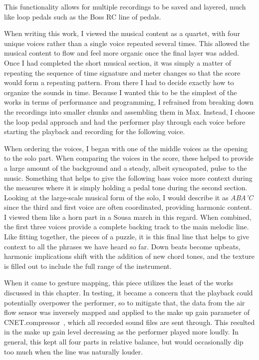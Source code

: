 This functionality allows for multiple recordings to be saved and layered, much like loop pedals such as the Boss RC line of pedals.

When writing this work, I viewed the musical content as a quartet, with four unique voices rather than a single voice repeated several times. This allowed the musical content to flow and feel more organic once the final layer was added. 
Once I had completed the short musical section, it was simply a matter of repeating the sequence of time signature and meter changes so that the score would form a repeating pattern. From there I had to decide exactly how to organize the sounds in time. Because I wanted this to be the simplest of the works in terms of performance and programming, I refrained from breaking down the recordings into smaller chunks and assembling them in Max. Instead, I choose the loop pedal approach and had the performer play through each voice before starting the playback and recording for the following voice. 

When ordering the voices, I began with one of the middle voices as the opening to the solo part. When comparing the voices in the score, these helped to provide a large amount of the background and a steady, albeit syncopated, pulse to the music. Something that helps to give the following bass voice more context during the measures where it is simply holding a pedal tone during the second section. Looking at the large-scale musical form of the solo, I would describe it as \emph{ABA'C} since the third and first voice are often coordinated, providing harmonic content. I viewed them like a horn part in a Sousa march in this regard. When combined, the first three voices provide a complete backing track to the main melodic line. Like fitting together, the pieces of a puzzle, it is this final line that helps to give context to all the phrases we have heard so far. Down beats become upbeats, harmonic implications shift with the addition of new chord tones, and the texture is filled out to include the full range of the instrument.

When it came to gesture mapping, this piece utilizes the least of the works discussed in this chapter. In testing, it became a concern that the playback could potentially overpower the performer, so to mitigate that, the data from the air flow sensor was inversely mapped and applied to the make up gain parameter of CNET.compressor~, which all recorded sound files are sent through. This resulted in the make up gain level decreasing as the performer played more loudly. In general, this kept all four parts in relative balance, but would occasionally dip too much when the line was naturally louder.


